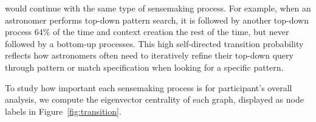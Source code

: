  would continue with the same type of sensemaking process.
 For example, when an astronomer performs top-down pattern search,
 it is followed by another top-down process 64\% of the time and context creation the rest of the time,
 but never followed by a bottom-up processes.
 This high self-directed transition probability
 reflects how astronomers often need to iteratively
 refine their top-down query through pattern
 or match specification when looking for a specific pattern. %
 \par To study how important each sensemaking process
 is for participant's overall analysis,
 we compute the eigenvector centrality of each graph,
 displayed as node labels in Figure~\ref{fig:transition}.
